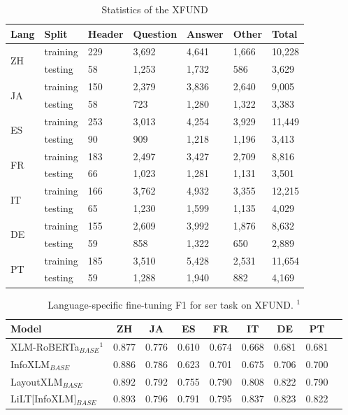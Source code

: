 \begin{table}[H]
\centering
\begin{tabular}{@{}lllllll@{}}
\hline
                 \textbf{Lang} & \textbf{Split}  &\textbf{Header}  &\textbf{Question}  & \textbf{Answer}  &\textbf{Other}  &\textbf{Total}  \\ \toprule
\multirow{2}{*}{ZH} &  training&229  &  3,692& 4,641  & 1,666  &10,228  \\ 
                  &  testing& 58  &1,253  & 1,732  & 586  & 3,629  \\ \midrule
\multirow{2}{*}{JA} & training & 150  & 2,379  & 3,836  & 2,640  & 9,005  \\
                  &  testing & 58  & 723  & 1,280  & 1,322  & 3,383  \\\midrule
\multirow{2}{*}{ES} & training  &  253& 3,013  & 4,254  &3,929  &11,449  \\
                  &  testing&  90& 909 &1,218  &1,196  &3,413  \\\midrule
\multirow{2}{*}{FR} & training & 183  &2,497  &3,427  &2,709  &8,816  \\
                  &  testing&66  &1,023  &1,281  &1,131  &3,501  \\\midrule
\multirow{2}{*}{IT} &  training &166  &3,762  &4,932  &3,355  &12,215  \\
                  &  testing& 65 &1,230  &1,599  &1,135 &4,029  \\\midrule
\multirow{2}{*}{DE} &training  &155  &2,609  &3,992  &1,876  &8,632  \\
                  &  testing&59  &858  &1,322  &650  &2,889  \\\midrule
\multirow{2}{*}{PT} & training &185  & 3,510 &5,428  &2,531   &  11,654\\
                  &  testing &59  &1,288  &1,940  &882  &4,169 \\ \bottomrule
\end{tabular}
\caption{Statistics of the XFUND \cite{xfund}}
\label{tab:XFUND_statistics}
\end{table}

\begin{table}[!ht]
    \centering
    \begin{tabular}{lcccccccl}
    \toprule
          Model&ZH&JA&ES&FR&IT&DE&PT  \\ \midrule
         XLM-RoBERTa\(_{BASE}\)$^1$& 0.877&0.776&0.610&0.674&0.668&0.681&0.681 \\
         InfoXLM\(_{BASE}\)&  0.886 & 0.786 & 0.623 &0.701 & 0.675 & 0.706 & 0.700 \\
         LayoutXLM\(_{BASE}\) &  0.892 & 0.792 & 0.755 & 0.790 & 0.808 & 0.822 & 0.790 \\ \midrule
         LiLT[InfoXLM]\(_{BASE}\) &  0.893 & 0.796 & 0.791& 0.795& 0.837& 0.823& 0.822 \\ \bottomrule
    \end{tabular}
    \caption{Language-specific fine-tuning F1 for \acrshort{ser} task on XFUND. $^1$\cite{li2021cross}}
    \label{tab:Comparision_Xfund}
\end{table}


